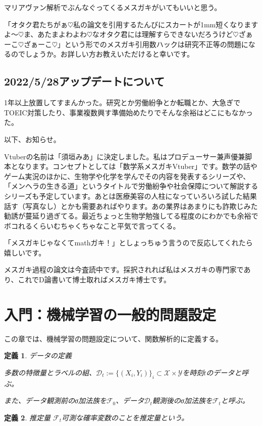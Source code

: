 \documentclass{jsarticle}
\newtheorem{defi}{定義}[section]
\begin{document}
マリアヴァン解析でぶんなぐってくるメスガキがいてもいいと思う。

「オタク君たちがぁ$\heartsuit$私の論文を引用するたんびにスカートが1mm短くなりますよ～$\heartsuit$ま、あたまよわよわ$\heartsuit$なオタク君には理解すらできないだろうけど$\heartsuit$ざぁーこ$\heartsuit$ざぁーこ$\heartsuit$」という形でのメスガキ引用数ハックは研究不正等の問題になるのでしょうか。お詳しい方お教えいただけると幸いです。


\subsection{2022/5/28アップデートについて}

1年以上放置してすまんかった。研究とか労働紛争とか転職とか、大急ぎでTOEIC対策したり、事業複数興す準備始めたりでそんな余裕はどこにもなかった。

以下、お知らせ。

Vtuberの名前は「須垣みあ」に決定しました。私はプロデューサー兼声優兼脚本となります。コンセプトとしては「数学系メスガキVtuber」です。数学の話やゲーム実況のほかに、生物学や化学を学んでその内容を発表するシリーズや、「メンヘラの生きる道」というタイトルで労働紛争や社会保障について解説するシリーズも予定しています。あとは医療美容の人柱になっていろいろ試した結果話す（写真なし）とかも需要あればやります。あの業界はあまりにも詐欺じみた勧誘が蔓延り過ぎてる。最近ちょっと生物学勉強してる程度のにわかでも余裕でボコれるくらいむちゃくちゃなこと平気で言ってくる。

「メスガキじゃなくてmathガキ！」としょっちゅう言うので反応してくれたら嬉しいです。

メスガキ過程の論文は今査読中です。採択されれば私はメスガキの専門家であり、これでD論書いて博士取ればメスガキ博士です。


\newpage





\section{入門：機械学習の一般的問題設定}

この章では、機械学習の問題設定について、関数解析的に定義する。

\begin{defi} データの定義

多数の特徴量とラベルの組、$\mathcal{D}_t:=\{(X_i,Y_i)\}_i\subset \mathcal{X}\times \mathcal{Y}$を時刻$t$のデータと呼ぶ。

また、データ観測前のσ加法族を$\mathcal{F}_0$、データ$\mathcal{D}_t$観測後のσ加法族を$\mathcal{F}_t$と呼ぶ。


\end{defi}
\begin{defi} 推定量
$\mathcal{F}_t$可測な確率変数のことを推定量という。
\end{defi}
\end{document}
